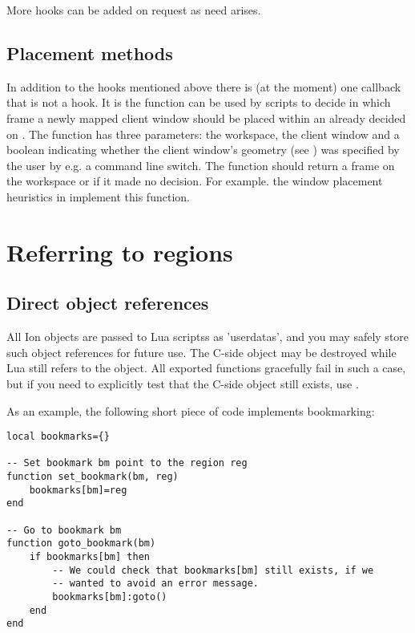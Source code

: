 More hooks can be added on request as need arises.

\subsection{Placement methods}

In addition to the hooks mentioned above there is (at the moment) 
one callback that is not a hook. It is the function
 can be used by scripts to decide
in which frame a newly mapped client window should be placed 
within an already decided on . The function has
three parameters: the workspace, the client window and a boolean
indicating whether the client window's geometry (see
) was specified by the user by e.g. a
 command line switch. The function should
return a frame on the workspace or  if it made no
decision. For example. the window placement heuristics in 
 implement this function.

\section{Referring to regions}

\subsection{Direct object references}

All Ion objects are passed to Lua scriptss as 'userdatas', and you may
safely store such object references for future use. The C-side object
may be destroyed while Lua still refers to the object. All exported
functions gracefully fail in such a case, but if you need to explicitly
test that the C-side object still exists, use .

As an example, the following short piece of code implements 
bookmarking:

\begin{verbatim}
local bookmarks={}

-- Set bookmark bm point to the region reg
function set_bookmark(bm, reg)
    bookmarks[bm]=reg
end

-- Go to bookmark bm
function goto_bookmark(bm)
    if bookmarks[bm] then
        -- We could check that bookmarks[bm] still exists, if we
        -- wanted to avoid an error message.
        bookmarks[bm]:goto()
    end
end
\end{verbatim}

